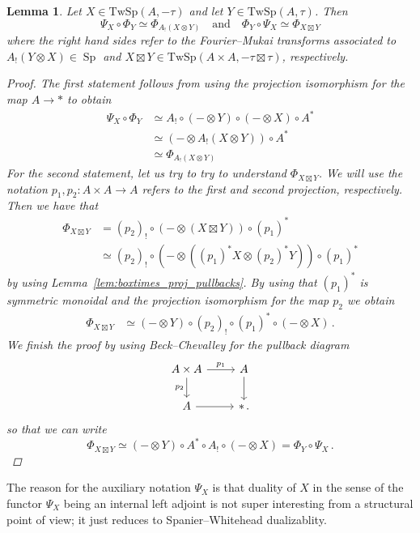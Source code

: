 \documentclass[10pt]{amsart}
\theoremstyle{plain}
\newtheorem{lemma}[theorem]{Lemma}
\theoremstyle{definition}
\DeclareMathOperator{\Sp}{Sp}
\newcommand{\TwSp}{\mathrm{TwSp}}
\newcommand{\och}{\quad \text{and} \quad}
\begin{document}
\begin{lemma}
  Let $X \in \TwSp(A,-\tau)$ and let $Y \in \TwSp(A,\tau)$. Then
  \[
  \Psi_X \circ \Phi_{Y} \simeq \Phi_{A_!(X \otimes Y)} \och \Phi_Y \circ \Psi_{X} \simeq \Phi_{X \boxtimes Y}
  \]
  where the right hand sides refer to the Fourier--Mukai transforms associated to $A_!(Y \otimes X) \in \Sp$ and $X \boxtimes Y \in \TwSp(A \times A, -\tau \boxtimes \tau)$, respectively.
  \begin{proof}
    The first statement follows from using the projection isomorphism for the map $A \to \ast$ to obtain
    \begin{align*}
      \Psi_X \circ \Phi_Y &\simeq A_! \circ (- \otimes Y) \circ (- \otimes X) \circ A^* \\ &\simeq (- \otimes A_!(X \otimes Y)) \circ A^* \\ &\simeq \Phi_{A_!(X \otimes Y)}
    \end{align*}
    For the second statement, let us try to try to understand $\Phi_{X \boxtimes Y}$.
    We will use the notation $p_1 , p_2 : A \times A \to A$ refers to the first and second projection, respectively. Then we have that
    \begin{align*}
    \Phi_{X \boxtimes Y} &= (p_2)_! \circ (- \otimes (X \boxtimes Y)) \circ (p_1)^* \\ &\simeq (p_2)_! \circ (- \otimes ((p_1)^* X \otimes (p_2)^* Y)) \circ (p_1)^*
    \end{align*}
    by using Lemma~\ref{lem:boxtimes_proj_pullbacks}. By using that $(p_1)^*$ is symmetric monoidal and the projection isomorphism for the map $p_2$ we obtain
    \begin{align*}
    \Phi_{X \boxtimes Y} &\simeq (- \otimes Y)\circ (p_2)_!\circ (p_1)^* \circ  (- \otimes X) \,.
    \end{align*}
    We finish the proof by using Beck--Chevalley for the pullback diagram
    \[
    \begin{tikzcd}
      A \times A \arrow[d,"p_2"'] \arrow[r,"p_1"] & A \arrow[d] \\
      A \arrow[r] & \ast \,.
    \end{tikzcd}
    \]
    so that we can write
    \[
    \Phi_{X \boxtimes Y} \simeq (- \otimes Y) \circ A^* \circ A_! \circ (- \otimes X) = \Phi_Y \circ \Psi_X \,.
    \]
  \end{proof}
\end{lemma}

The reason for the auxiliary notation $\Psi_X$ is that duality of $X$ in the sense of the functor $\Psi_X$ being an internal left adjoint is not super interesting from a structural point of view; it just reduces to Spanier--Whitehead dualizablity.
\end{document}
